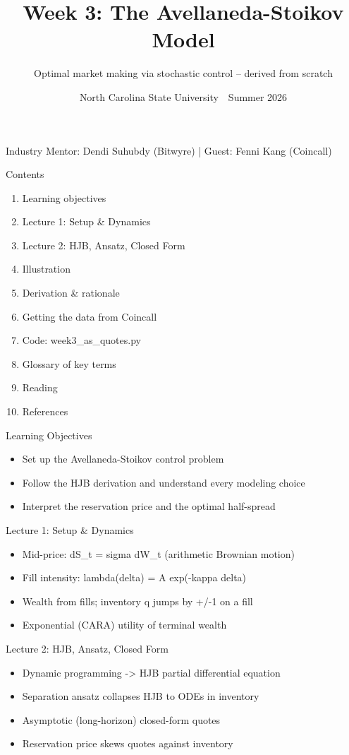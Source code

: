 \documentclass[aspectratio=169,10pt]{beamer}
\title{Week 3: The Avellaneda-Stoikov Model}
\subtitle{Optimal market making via stochastic control -- derived from scratch}
\date{North Carolina State University \,\textbar\, Summer 2026}
\begin{document}
\begin{frame}[plain]\titlepage\begin{center}\tiny Industry Mentor: Dendi Suhubdy (Bitwyre)  |  Guest: Fenni Kang (Coincall)\end{center}\end{frame}
\begin{frame}{Contents}
\small\begin{enumerate}\setlength{\itemsep}{3pt}
  \item Learning objectives
  \item Lecture 1: Setup \& Dynamics
  \item Lecture 2: HJB, Ansatz, Closed Form
  \item Illustration
  \item Derivation \& rationale
  \item Getting the data from Coincall
  \item Code: week3\_as\_quotes.py
  \item Glossary of key terms
  \item Reading
  \item References
\end{enumerate}
\end{frame}

\begin{frame}{Learning Objectives}
\begin{itemize}
  \item Set up the Avellaneda-Stoikov control problem
  \item Follow the HJB derivation and understand every modeling choice
  \item Interpret the reservation price and the optimal half-spread
\end{itemize}
\end{frame}

\begin{frame}{Lecture 1: Setup \& Dynamics}
\begin{itemize}
  \item Mid-price: dS\_t = sigma dW\_t  (arithmetic Brownian motion)
  \item Fill intensity: lambda(delta) = A exp(-kappa delta)
  \item Wealth from fills; inventory q jumps by +/-1 on a fill
  \item Exponential (CARA) utility of terminal wealth
\end{itemize}
\end{frame}

\begin{frame}{Lecture 2: HJB, Ansatz, Closed Form}
\begin{itemize}
  \item Dynamic programming -\textgreater{} HJB partial differential equation
  \item Separation ansatz collapses HJB to ODEs in inventory
  \item Asymptotic (long-horizon) closed-form quotes
  \item Reservation price skews quotes against inventory
\end{itemize}
\end{frame}
\end{document}
